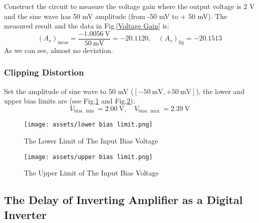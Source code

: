 \documentclass[UTF8]{article}
\theoremstyle{MyLineTheoremStyle} %
\theoremstyle{MyBlockTheoremStyle} %
\theoremstyle{MySubsubsectionStyle} %
\begin{document}
Construct the circuit to measure the voltage gain where the output voltage is 2 V and the sine wave has 50 mV amplitude (from -50 mV to + 50 mV). The measured result and the data in Fig.\ref{Voltage Gain} is:
\begin{equation}
\left(A_v\right)_{\text{meas}} = \frac{-1.0056 \ \mathrm{V}}{50 \ \mathrm{mV}} = -20.1120,\quad \left(A_v\right)_{\text{fig}}  = -20.1513
\end{equation}
As we can see, almost no deviation.

\subsubsection{Clipping Distortion}
Set the amplitude of sine wave to 50 mV ($[-50 \ \mathrm{mV}, +50 \ \mathrm{mV}]$), the lower and upper bias limits are (see Fig.\ref{The Lower Limit} and Fig.\ref{The Upper Limit}):
\begin{equation}
V_{\text{bias}, \min} = 2.00 \ \mathrm{V},\quad V_{\text{bias}, \max} = 2.39 \ \mathrm{V}
\end{equation}
\begin{figure}[H]\centering
    \texttt{[image: assets/lower bias limit.png]}
    \caption{The Lower Limit of The Input Bias Voltage}
    \label{The Lower Limit}
\end{figure}
\begin{figure}[H]\centering
    \texttt{[image: assets/upper bias limit.png]}
    \caption{The Upper Limit of The Input Bias Voltage}
    \label{The Upper Limit}
\end{figure}

\subsection{The Delay of Inverting Amplifier as a Digital Inverter}
\end{document}
